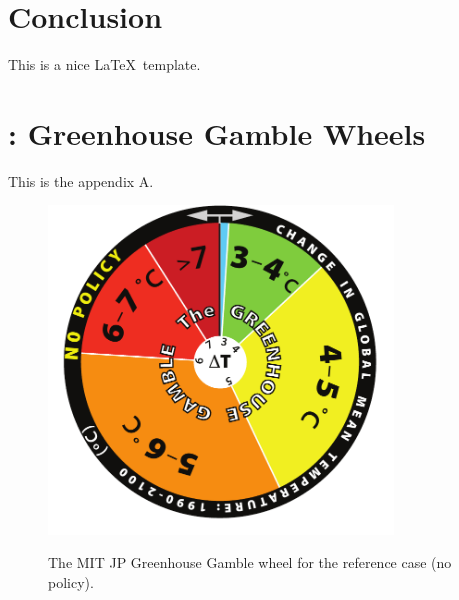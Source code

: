 \documentclass[12pt,fleqn]{article}
\begin{document}
\section{Conclusion}

This is a nice \LaTeX\, template.


\nocite{*}





\newpage
\appendix

\section{: Greenhouse Gamble Wheels}

This is the appendix A.

\begin{figure}[h!]
  \centering
  \noindent\includegraphics[width=3.6in]{../figure/GHG_ReferenceWheel2009.pdf}\\
  \caption{The MIT JP Greenhouse Gamble wheel for the reference case (no policy).}\label{fig:jpwheelnopolicy}
\end{figure}
\end{document}
